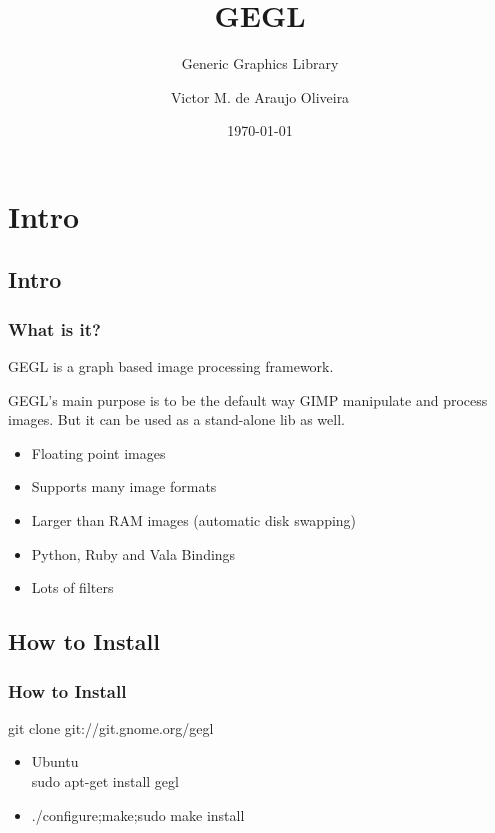 \documentclass{beamer}
\title{GEGL}
\subtitle{Generic Graphics Library}
\author{Victor M. de Araujo Oliveira}
\date{\today}
\begin{document}
\begin{frame}
\titlepage
\begin{center}
\end{center}
\end{frame}

\section[Contents]{}
\frame{\tableofcontents}

\section{Intro}

\subsection{Intro}

\begin{frame}
  \frametitle{What is it?}
GEGL is a graph based image processing framework.

GEGL's main purpose is to be the default way GIMP manipulate and
process images. But it can be used as a stand-alone lib as well.

  \begin{itemize}
    \item{Floating point images}
    \item{Supports many image formats}
    \item{Larger than RAM images (automatic disk swapping)}
    \item{Python, Ruby and Vala Bindings}
    \item{Lots of filters}
  \end{itemize}
\end{frame}

\subsection{How to Install}

\begin{frame}
  \frametitle{How to Install}
  
git clone git://git.gnome.org/gegl
\begin{itemize}
  \item{Ubuntu \\ sudo apt-get install gegl}
  \pause
  \item{./configure;make;sudo make install}
\end{itemize}
\end{frame}
\end{document}
